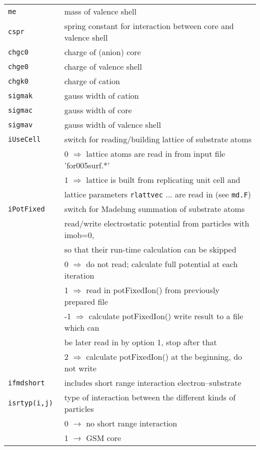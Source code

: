 \documentclass[12pt]{article}
\begin{document}
\begin{tabular}{ll}
{\tt me               }& mass of valence shell\\
{\tt cspr             }& spring constant for interaction between core and valence shell\\
{\tt chgc0            }& charge of (anion) core\\
{\tt chge0            }& charge of valence shell\\
{\tt chgk0            }& charge of cation\\
{\tt sigmak           }& gauss width of cation\\
{\tt sigmac           }& gauss width of core\\
{\tt sigmav           }& gauss width of valence shell\\
{\tt iUseCell         }& switch for reading/building lattice of
                          substrate atoms\\
   & 0 $\Longrightarrow$ lattice atoms are read in from input file 'for005surf.*'\\
   & 1 $\Longrightarrow$ lattice is built from replicating unit cell and\\
   &\qquad lattice parameters {\tt rlattvec} ... are
                          read in (see {\tt md.F})\\
{\tt iPotFixed        }& switch for Madelung summation of substrate atoms\\
   & read/write electrostatic potential from particles with imob=0,\\
   &  so that their run-time calculation can be skipped\\
   &   0 $\Longrightarrow$ do not read; calculate full potential at each iteration\\
   &   1 $\Longrightarrow$ read in potFixedIon() from previously prepared file\\
   &  -1 $\Longrightarrow$ calculate potFixedIon() write result to a file which can\\
   &\qquad  be later read in by option 1, stop after that\\
   &   2 $\Longrightarrow$ calculate potFixedIon() at the beginning, do not write\\
{\tt ifmdshort} & includes short range interaction electron--substrate\\
{\tt isrtyp(i,j)      }& type of interaction between the different kinds of particles\\
{\tt                  }& 0   $\rightarrow$ no short range interaction\\
{\tt                  }& 1   $\rightarrow$ GSM core\\

\end{tabular}
\end{document}
